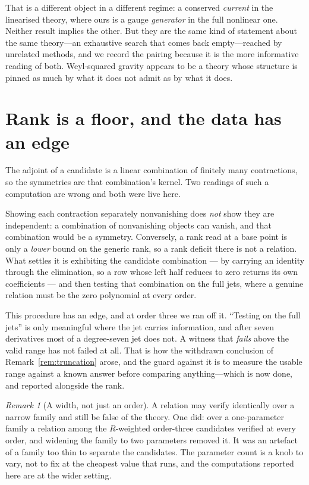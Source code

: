 \documentclass[11pt]{article}
\theoremstyle{definition}
\theoremstyle{remark}
\newtheorem{remark}[theorem]{Remark}
\begin{document}
That is a different object in a different regime: a conserved \emph{current}
in the linearised theory, where ours is a gauge \emph{generator} in the full
nonlinear one.  Neither result implies the other.  But they are the same kind
of statement about the same theory---an exhaustive search that comes back
empty---reached by unrelated methods, and we record the pairing because it is
the more informative reading of both.  Weyl-squared gravity appears to be a
theory whose structure is pinned as much by what it does not admit as by what
it does.

\section{Rank is a floor, and the data has an edge}
\label{sec:rank}

The adjoint of a candidate is a linear combination of finitely many
contractions, so the symmetries are that combination's kernel.  Two readings of
such a computation are wrong and both were live here.

Showing each contraction separately nonvanishing does \emph{not} show they are
independent: a combination of nonvanishing objects can vanish, and that
combination would be a symmetry.  Conversely, a rank read at a base point is
only a \emph{lower} bound on the generic rank, so a rank deficit there is not a
relation.  What settles it is exhibiting the candidate combination --- by
carrying an identity through the elimination, so a row whose left half reduces
to zero returns its own coefficients --- and then testing that combination on
the full jets, where a genuine relation must be the zero polynomial at every
order.

This procedure has an edge, and at order three we ran off it.  ``Testing on
the full jets'' is only meaningful where the jet carries information, and after
seven derivatives most of a degree-seven jet does not.  A witness that
\emph{fails} above the valid range has not failed at all.  That is how the
withdrawn conclusion of Remark~\ref{rem:truncation} arose, and the guard
against it is to measure the usable range against a known answer before
comparing anything---which is now done, and reported alongside the rank.

\begin{remark}[A width, not just an order]
A relation may verify identically over a narrow family and still be false of
the theory.  One did: over a one-parameter family a relation among the
\(R\)-weighted order-three candidates verified at every order, and widening the
family to two parameters removed it.  It was an artefact of a family too thin
to separate the candidates.  The parameter count is a knob to vary, not to fix
at the cheapest value that runs, and the computations reported here are at the
wider setting.
\end{remark}
\end{document}
